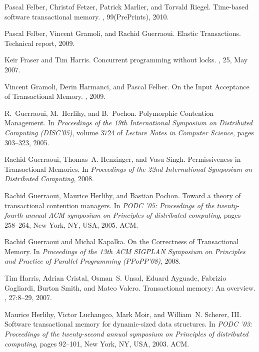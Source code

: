 \begin{thebibliography}{99}
{
Pascal Felber, Christof Fetzer, Patrick Marlier, and Torvald Riegel.
\newblock Time-based software transactional memory.
,
  99(PrePrints), 2010.

Pascal Felber, Vincent Gramoli, and Rachid Guerraoui.
\newblock Elastic {T}ransactions.
\newblock Technical report, 2009.

Keir Fraser and Tim Harris.
\newblock Concurrent programming without locks.
, 25, May 2007.

Vincent Gramoli, Derin Harmanci, and Pascal Felber.
\newblock On the {I}nput {A}cceptance of {T}ransactional {M}emory.
, 2009.

R.~Guerraoui, M.~Herlihy, and B.~Pochon.
\newblock Polymorphic {C}ontention {M}anagement.
\newblock In {\em Proceedings of the 19th {I}nternational {S}ymposium on
  {D}istributed {C}omputing ({DISC}'05)}, volume 3724 of {\em Lecture Notes in
  Computer Science}, pages 303--323, 2005.

Rachid Guerraoui, Thomas~A. Henzinger, and Vasu Singh.
\newblock Permissiveness in {T}ransactional {M}emories.
\newblock In {\em Proceedings of the 22nd {I}nternational {S}ymposium on
  {D}istributed {C}omputing}, 2008.

Rachid Guerraoui, Maurice Herlihy, and Bastian Pochon.
\newblock Toward a theory of transactional contention managers.
\newblock In {\em PODC '05: Proceedings of the twenty-fourth annual ACM
  symposium on Principles of distributed computing}, pages 258--264, New York,
  NY, USA, 2005. ACM.

Rachid Guerraoui and Michal Kapalka.
\newblock On the {C}orrectness of {T}ransactional {M}emory.
\newblock In {\em Proceedings of the 13th {ACM} {SIGPLAN} {S}ymposium on
  {P}rinciples and {P}ractice of {P}arallel {P}rogramming ({PP}o{PP}'08)},
  2008.

Tim Harris, Adrian Cristal, Osman~S. Unsal, Eduard Ayguade, Fabrizio Gagliardi,
  Burton Smith, and Mateo Valero.
\newblock Transactional memory: An overview.
, 27:8--29, 2007.

Maurice Herlihy, Victor Luchangco, Mark Moir, and William~N. Scherer, III.
\newblock Software transactional memory for dynamic-sized data structures.
\newblock In {\em PODC '03: Proceedings of the twenty-second annual symposium
  on Principles of distributed computing}, pages 92--101, New York, NY, USA,
  2003. ACM.

}
\end{thebibliography}
